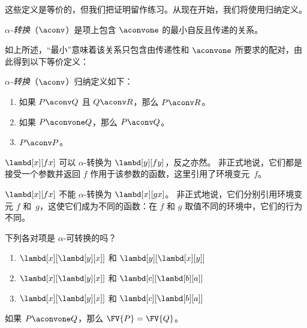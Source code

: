 \documentclass[../../../include/open-logic-section]{subfiles}
\begin{document}
这些定义是等价的，但我们把证明留作练习。从现在开始，我们将使用归纳定义。

\begin{defn}
  \emph{$\alpha$-转换}（$\aconv$）是项上包含 $\aconvone$ 的最小自反且传递的关系。
\end{defn}

如上所述，“最小”意味着该关系只包含由传递性和 $\aconvone$ 所要求的配对，由此得到以下等价定义：

\begin{defn} 
  \emph{$\alpha$-转换}（$\aconv$）归纳定义如下：
  \begin{enumerate}
  \item 如果 $P \aconv Q$ 且 $Q \aconv R$，那么 $P \aconv R$。
  \item 如果 $P \aconvone Q$，那么 $P \aconv Q$。 
  \item $P \aconv P$。 
  \end{enumerate}
\end{defn}

\begin{ex}
  $\lambd[x][f x]$ 可以 $\alpha$-转换为 $\lambd[y][f y]$，反之亦然。
  非正式地说，它们都是接受一个参数并返回 $f$ 作用于该参数的函数，这里引用了环境变元~$f$。

  $\lambd[x][f x]$ 不能 $\alpha$-转换为 $\lambd[x][g x]$。
  非正式地说，它们分别引用环境变元 $f$ 和~$g$，这使它们成为不同的函数：在 $f$ 和 $g$ 取值不同的环境中，它们的行为不同。
\end{ex}

\begin{prob}
  下列各对项是 $\alpha$-可转换的吗？
  \begin{enumerate}
  \item $\lambd[x][\lambd[y][x]]$ 和 $\lambd[y][\lambd[x][y]]$
  \item $\lambd[x][\lambd[y][x]]$ 和 $\lambd[c][\lambd[b][a]]$
  \item $\lambd[x][\lambd[y][x]]$ 和 $\lambd[c][\lambd[b][a]]$
  \end{enumerate}
\end{prob}

\begin{lem}
  如果 $P \aconvone Q$，那么 $\FV{P} = \FV{Q}$。
\end{lem}
\end{document}
